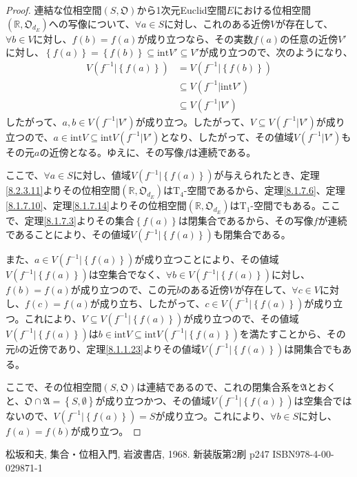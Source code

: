 \documentclass[dvipdfmx]{jsarticle}
\begin{document}
\begin{proof}
連結な位相空間$\left( S,\mathfrak{O} \right)$から1次元Euclid空間$E$における位相空間$\left( \mathbb{R},\mathfrak{O}_{d_{E}} \right)$への写像について、$\forall a \in S$に対し、これのある近傍$V$が存在して、$\forall b \in V$に対し、$f(b) = f(a)$が成り立つなら、その実数$f(a)$の任意の近傍$V'$に対し、$\left\{ f(a) \right\} = \left\{ f(b) \right\} \subseteq {\mathrm{int}}V' \subseteq V'$が成り立つので、次のようになり、
\begin{align*}
V\left( f^{- 1}|\left\{ f(a) \right\} \right) &= V\left( f^{- 1}|\left\{ f(b) \right\} \right)\\
&\subseteq V\left( f^{- 1}|{\mathrm{int}}V' \right)\\
&\subseteq V\left( f^{- 1}|V' \right)
\end{align*}
したがって、$a,b \in V\left( f^{- 1}|V' \right)$が成り立つ。したがって、$V \subseteq V\left( f^{- 1}|V' \right)$が成り立つので、$a \in {\mathrm{int}}V \subseteq {\mathrm{int}}{V\left( f^{- 1}|V' \right)}$となり、したがって、その値域$V\left( f^{- 1}|V' \right)$もその元$a$の近傍となる。ゆえに、その写像$f$は連続である。\par
ここで、$\forall a \in S$に対し、値域$V\left( f^{- 1}|\left\{ f(a) \right\} \right)$が与えられたとき、定理\ref{8.2.3.11}よりその位相空間$\left( \mathbb{R},\mathfrak{O}_{d_{E}} \right)$は$\mathrm{T}_{4}$-空間であるから、定理\ref{8.1.7.6}、定理\ref{8.1.7.10}、定理\ref{8.1.7.14}よりその位相空間$\left( \mathbb{R},\mathfrak{O}_{d_{E}} \right)$は$\mathrm{T}_{1}$-空間でもある。ここで、定理\ref{8.1.7.3}よりその集合$\left\{ f(a) \right\}$は閉集合であるから、その写像$f$が連続であることにより、その値域$V\left( f^{- 1}|\left\{ f(a) \right\} \right)$も閉集合である。\par
また、$a \in V\left( f^{- 1}|\left\{ f(a) \right\} \right)$が成り立つことにより、その値域$V\left( f^{- 1}|\left\{ f(a) \right\} \right)$は空集合でなく、$\forall b \in V\left( f^{- 1}|\left\{ f(a) \right\} \right)$に対し、$f(b) = f(a)$が成り立つので、この元$b$のある近傍$V$が存在して、$\forall c \in V$に対し、$f(c) = f(a)$が成り立ち、したがって、$c \in V\left( f^{- 1}|\left\{ f(a) \right\} \right)$が成り立つ。これにより、$V \subseteq V\left( f^{- 1}|\left\{ f(a) \right\} \right)$が成り立つので、その値域$V\left( f^{- 1}|\left\{ f(a) \right\} \right)$は$b \in {\mathrm{int}}V \subseteq {\mathrm{int}}{V\left( f^{- 1}|\left\{ f(a) \right\} \right)}$を満たすことから、その元$b$の近傍であり、定理\ref{8.1.1.23}よりその値域$V\left( f^{- 1}|\left\{ f(a) \right\} \right)$は開集合でもある。\par
ここで、その位相空間$\left( S,\mathfrak{O} \right)$は連結であるので、これの閉集合系を$\mathfrak{A}$とおくと、$\mathfrak{O \cap A} =\left\{ S,\emptyset \right\}$が成り立つかつ、その値域$V\left( f^{- 1}|\left\{ f(a) \right\} \right)$は空集合ではないので、$V\left( f^{- 1}|\left\{ f(a) \right\} \right) = S$が成り立つ。これにより、$\forall b \in S$に対し、$f(a) = f(b)$が成り立つ。
\end{proof}
\begin{thebibliography}{50}
  松坂和夫, 集合・位相入門, 岩波書店, 1968. 新装版第2刷 p247 ISBN978-4-00-029871-1
\end{thebibliography}
\end{document}
